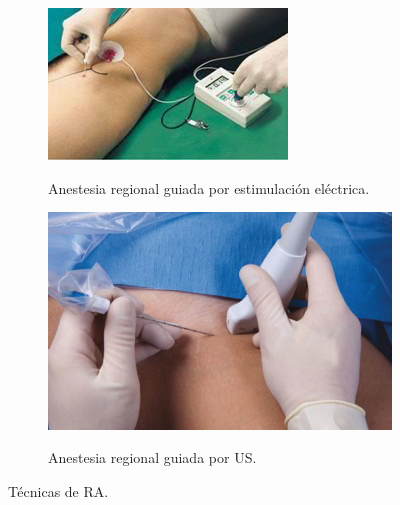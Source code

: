 \begin{figure}[h]
   \begin{subfigure}[b]{0.45\linewidth}
        \centering
        {\includegraphics[width=\linewidth]{IMG/electrical.png}}
        \caption{\label{fig:electrical}Anestesia regional guiada por estimulación eléctrica.}
    \end{subfigure}
    \null\hfill
     \begin{subfigure}[b]{0.45\linewidth}
        \centering
        {\includegraphics[width=\linewidth]{IMG/RAUS.png}}
        \caption{\label{fig:raus}Anestesia regional guiada por \acl{US}.}
    \end{subfigure}
     
    \caption{Técnicas de \acl{RA}.}
   \end{figure}
   
